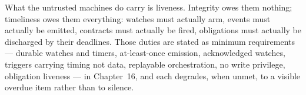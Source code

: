 What the untrusted machines do carry is liveness. Integrity owes them nothing;
timeliness owes them everything: watches must actually arm, events must
actually be emitted, contracts must actually be fired, obligations must
actually be discharged by their deadlines. Those duties are stated as minimum
requirements --- durable watches and timers, at-least-once emission,
acknowledged watches, triggers carrying timing not data, replayable
orchestration, no write privilege, obligation liveness --- in Chapter~16, and
each degrades, when unmet, to a visible overdue item rather than to silence.
